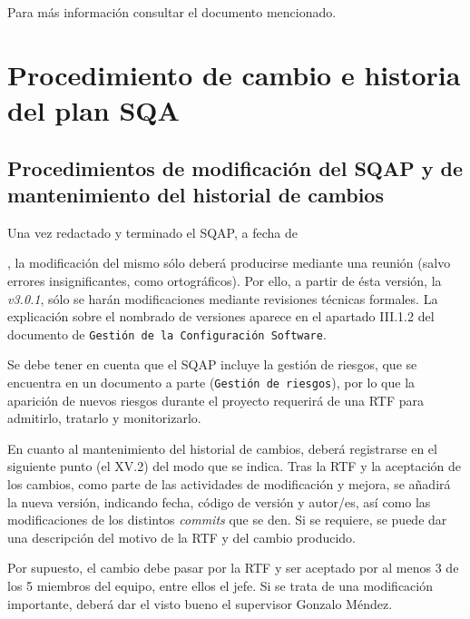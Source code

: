 \documentclass[spanish,a4paper,11pt, twoside]{report}	%
\begin{document}
	Para más información consultar el documento mencionado.


\newpage
\mbox{}
\thispagestyle{empty}						%
\newpage

\chapter{ Procedimiento de cambio e historia del plan SQA}
	\section{Procedimientos de modificación del SQAP y de mantenimiento del historial de cambios}
	
	Una vez redactado y terminado el SQAP, a fecha de \date{\Today}, la modificación del mismo sólo deberá producirse mediante una reunión (salvo errores insignificantes, como ortográficos). Por ello, a partir de ésta versión, la \textit{v3.0.1}, sólo se harán modificaciones mediante revisiones técnicas formales. La explicación sobre el nombrado de versiones aparece en el apartado III.1.2 del documento de \texttt{Gestión de la Configuración Software}.

	Se debe tener en cuenta que el SQAP incluye la gestión de riesgos, que se encuentra en un documento a parte (\texttt{Gestión de riesgos}), por lo que la aparición de nuevos riesgos durante el proyecto requerirá de una RTF para admitirlo, tratarlo y monitorizarlo.

	En cuanto al mantenimiento del historial de cambios, deberá registrarse en el siguiente punto (el XV.2) del modo que se indica. Tras la RTF y la aceptación de los cambios, como parte de las actividades de modificación y mejora, se añadirá la nueva versión, indicando fecha, código de versión y autor/es, así como las modificaciones de los distintos \textit{commits} que se den. Si se requiere, se puede dar una descripción del motivo de la RTF y del cambio producido.
		
	Por supuesto, el cambio debe pasar por la RTF y ser aceptado por al menos 3 de los 5 miembros del equipo, entre ellos el jefe. Si se trata de una modificación importante, deberá dar el visto bueno el supervisor Gonzalo Méndez.
\end{document}
